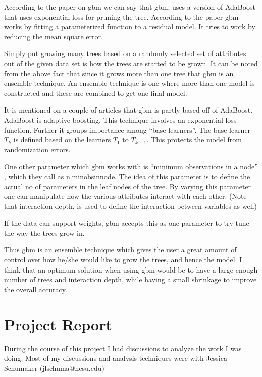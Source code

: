 \documentclass[paper=a4, fontsize=11pt]{scrartcl}	%
\numberwithin{equation}{section}		%
\numberwithin{figure}{section}			%
\numberwithin{table}{section}				%
\begin{document}
According to the paper on gbm we can say that gbm, uses a version of AdaBoost that uses exponential loss for pruning the tree. According to the paper gbm works by fitting a parameterized function to a residual model. It tries to work by reducing the mean square error.

Simply put growing many trees based on a randomly selected set of attributes out of the given data set is how the trees are started to be grown. It can be noted from the above fact that since it grows more than one tree that gbm is an ensemble technique. An ensemble technique is one where more than one model is constructed and these are combined to get one final model.

It is mentioned on a couple of articles that gbm is partly based off of AdaBoost. AdaBoost is adaptive boosting. This technique involves an exponential loss function. Further it groups importance among ``base learners''. The base learner $T_{k}$ is defined based on the learners $T_{1}$ to $T_{k-1}$. This protects the model from randomization errors.

One other parameter which gbm works with is ``minimum observations in a node'' , which they call as n.minobsinnode. The idea of this parameter is to define the actual no of parameters in the leaf nodes of the tree. By varying this parameter one can manipulate how the various attributes interact with each other. (Note that interaction depth, is used to define the interaction between variables as well)

If the data can support weights, gbm accepts this as one parameter to try tune the way the trees grow in. 

Thus gbm is an ensemble technique which gives the user a great amount of control over how he/she would like to grow the trees, and hence the model. I think that an optimum solution when using gbm would be to have a large enough number of trees and interaction depth, while having a small shrinkage to improve the overall accuracy.

\pagebreak
\section{Project Report}

During the course of this project I had discussions to analyze the work I was doing. Most of my discussions and analysis techniques were with Jessica Schumaker (jlschuma@ncsu.edu)
\end{document}
